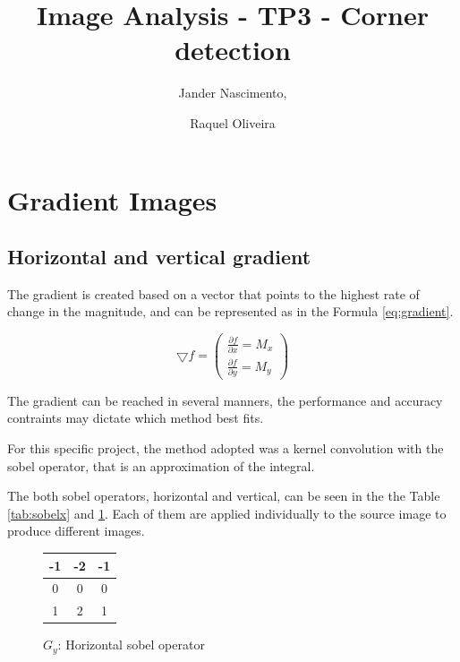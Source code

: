 \documentclass{article}
\begin{document}
\title{Image Analysis - TP3 - Corner detection}

\author{Jander Nascimento, 
\and Raquel Oliveira}

\maketitle

\section{Gradient Images}
	
	\subsection{Horizontal and vertical gradient}

	The gradient is created based on a vector that points to the highest rate of change in the magnitude, and can be represented as in the Formula \ref{eq:gradient}. 

\begin{equation}
\bigtriangledown f = \begin{pmatrix}
\frac{\partial f}{\partial x} = M_x\\ 
\frac{\partial f}{\partial y} = M_y
\end{pmatrix}
\label{eq:gradient}
\end{equation}

The gradient can be reached in several manners, the performance and accuracy contraints may dictate which method best fits. 

For this specific project, the method adopted was a kernel convolution with the sobel operator, that is an approximation of the integral. 

The both sobel operators, horizontal and vertical, can be seen in the the Table \ref{tab:sobelx} and \ref{tab:sobely}. Each of them are applied individually to the source image to produce different images.

\begin{figure}
  \begin{center}
  \begin{tabular}{ | c | c | c | }
    \hline
    -1 & -2 & -1 \\ \hline
    0 & 0 & 0 \\ \hline
    1 & 2 & 1 \\
    \hline
  \end{tabular}
  \end{center}
  \caption{$G_y$: Horizontal sobel operator\label{tab:sobely}}
\end{figure}
\end{document}
